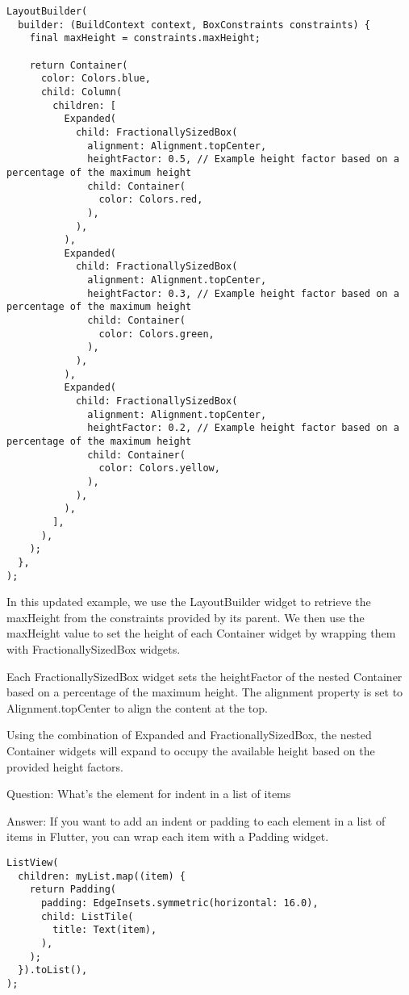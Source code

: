 \begin{lstlisting}
LayoutBuilder(
  builder: (BuildContext context, BoxConstraints constraints) {
    final maxHeight = constraints.maxHeight;

    return Container(
      color: Colors.blue,
      child: Column(
        children: [
          Expanded(
            child: FractionallySizedBox(
              alignment: Alignment.topCenter,
              heightFactor: 0.5, // Example height factor based on a percentage of the maximum height
              child: Container(
                color: Colors.red,
              ),
            ),
          ),
          Expanded(
            child: FractionallySizedBox(
              alignment: Alignment.topCenter,
              heightFactor: 0.3, // Example height factor based on a percentage of the maximum height
              child: Container(
                color: Colors.green,
              ),
            ),
          ),
          Expanded(
            child: FractionallySizedBox(
              alignment: Alignment.topCenter,
              heightFactor: 0.2, // Example height factor based on a percentage of the maximum height
              child: Container(
                color: Colors.yellow,
              ),
            ),
          ),
        ],
      ),
    );
  },
);
\end{lstlisting}

In this updated example, we use the LayoutBuilder widget to retrieve the maxHeight from the constraints provided 
by its parent. We then use the maxHeight value to set the height of each Container widget by wrapping them 
with FractionallySizedBox widgets.

Each FractionallySizedBox widget sets the heightFactor of the nested Container based on a percentage of the 
maximum height. The alignment property is set to Alignment.topCenter to align the content at the top.

Using the combination of Expanded and FractionallySizedBox, the nested Container widgets will expand to occupy 
the available height based on the provided height factors.


Question: What's the element for indent in a list of items

Answer: If you want to add an indent or padding to each element in a list of items in Flutter, you can 
wrap each item with a Padding widget.

\begin{lstlisting}
ListView(
  children: myList.map((item) {
    return Padding(
      padding: EdgeInsets.symmetric(horizontal: 16.0),
      child: ListTile(
        title: Text(item),
      ),
    );
  }).toList(),
);
\end{lstlisting}

